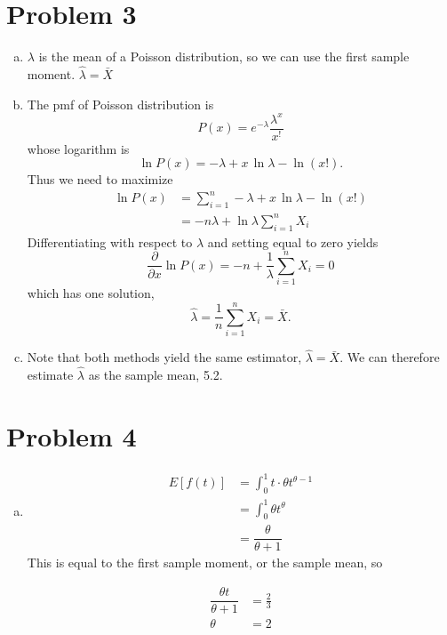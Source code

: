\documentclass[11pt]{article}
\begin{document}
\section*{Problem 3}

\begin{enumerate}[(a)]
	\item $\lambda$ is the mean of a Poisson distribution, so we can use the first sample moment. $\hat{\lambda} = \bar{X}$

	\item The pmf of Poisson distribution is
	\[P(x) = e^{-\lambda} \dfrac{\lambda^x}{x^!} \]
	whose logarithm is
	\[\ln P(x) = -\lambda + x\, \ln \lambda -  \ln(x!).\]
	Thus we need to maximize
	\begin{align*}
		\ln P(x) &= \sum \limits _{i=1} ^n -\lambda + x\, \ln \lambda -  \ln(x!) \\
		&= -n\lambda + \ln \lambda \sum \limits _{i=1} ^n X_i
	\end{align*}
	Differentiating with respect to $\lambda$ and setting equal to zero yields
	\[\frac{\partial}{\partial x} \ln P(x) = -n + \frac{1}{\lambda} \sum \limits _{i=1} ^n X_i = 0 \]
	which has one solution,
	\[ \hat{\lambda} = \frac{1}{n} \sum \limits _{i=1} ^n X_i = \bar{X}. \]

	\item Note that both methods yield the same estimator, $\hat{\lambda} = \bar{X}$. We can therefore estimate $\hat{\lambda}$ as the sample mean, 5.2.
\end{enumerate}

\section*{Problem 4}

\begin{enumerate}[(a)]
	\item 
		\begin{align*}
			E[f(t)] &= \int _0 ^1 t \cdot \theta t^{\theta-1} \\
			&= \int _0 ^1 \theta t^{\theta} \\
			&= \dfrac{ \theta}{\theta + 1}
		\end{align*}
		This is equal to the first sample moment, or the sample mean, so

		\begin{align*}
			\dfrac{ \theta t}{\theta + 1} &= \frac{2}{3} \\
			\theta &= 2
		\end{align*}
\end{enumerate}
\end{document}
